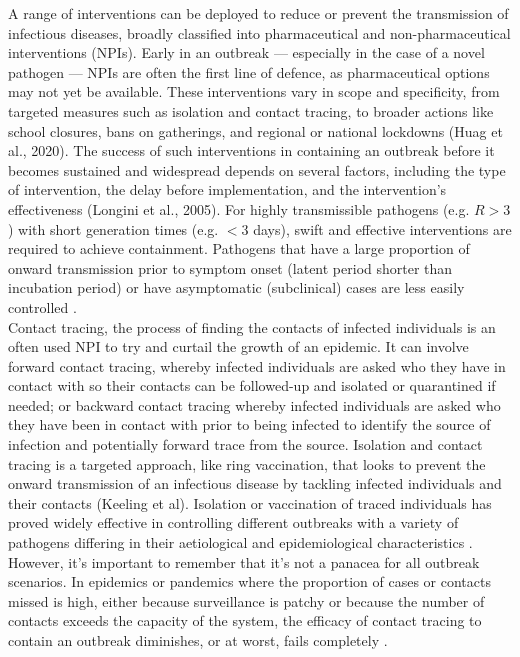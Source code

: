 \documentclass{article}
\begin{document}
A range of interventions can be deployed to reduce or prevent the transmission of infectious diseases, broadly classified into pharmaceutical and non-pharmaceutical interventions (NPIs). Early in an outbreak --- especially in the case of a novel pathogen --- NPIs are often the first line of defence, as pharmaceutical options may not yet be available. These interventions vary in scope and specificity, from targeted measures such as isolation and contact tracing, to broader actions like school closures, bans on gatherings, and regional or national lockdowns (Huag et al., 2020). The success of such interventions in containing an outbreak before it becomes sustained and widespread depends on several factors, including the type of intervention, the delay before implementation, and the intervention’s effectiveness (Longini et al., 2005). For highly transmissible pathogens (e.g. $R>3$) with short generation times (e.g. $<3$ days), swift and effective interventions are required to achieve containment. Pathogens that have a large proportion of onward transmission prior to symptom onset (latent period shorter than incubation period) or have asymptomatic (subclinical) cases are less easily controlled \citep{fraserFactorsThatMake2004}. \\

Contact tracing, the process of finding the contacts of infected individuals is an often used NPI to try and curtail the growth of an epidemic. It can involve forward contact tracing, whereby infected individuals are asked who they have in contact with so their contacts can be followed-up and isolated or quarantined if needed; or backward contact tracing whereby infected individuals are asked who they have been in contact with prior to being infected to identify the source of infection and potentially forward trace from the source. Isolation and contact tracing is a targeted approach, like ring vaccination, that looks to prevent the onward transmission of an infectious disease by tackling infected individuals and their contacts \citep{kucharskiEffectivenessRingVaccination2016, ferrettiQuantifyingSARSCoV2Transmission2020, whittakerQuantifyingImpactBroadly2024} (Keeling et al). Isolation or vaccination of traced individuals has proved widely effective in controlling different outbreaks with a variety of pathogens differing in their aetiological and epidemiological characteristics \citep{foegeSELECTIVEEPIDEMIOLOGICCONTROL1971, bellPublicHealthInterventions2004}. However, it's important to remember that it's not a panacea for all outbreak scenarios. In epidemics or pandemics where the proportion of cases or contacts missed is high, either because surveillance is patchy or because the number of contacts exceeds the capacity of the system, the efficacy of contact tracing to contain an outbreak diminishes, or at worst, fails completely \citep{dhillonWhenContactTracing2018, hellewellFeasibilityControllingCOVID192020}. \\
\end{document}

